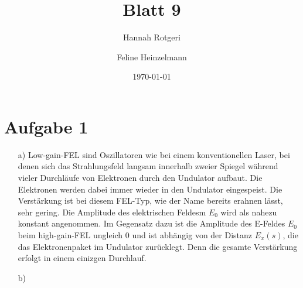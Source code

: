 \documentclass[11pt,a4paper]{article}
\title{Blatt 9}
\date{\today}
\author{Hannah Rotgeri \and Feline Heinzelmann}
\begin{document}
    \maketitle

    \section*{Aufgabe 1}
	\begin{itemize}
		\item[a)] 
			Low-gain-FEL sind Oszillatoren wie bei einem konventionellen Laser, bei denen sich das Strahlungsfeld langsam innerhalb zweier Spiegel während vieler 
			Durchläufe von Elektronen durch den Undulator aufbaut. Die Elektronen werden dabei immer wieder in den Undulator eingespeist. 
			Die Verstärkung ist bei diesem FEL-Typ, wie der Name bereits erahnen lässt, sehr gering.
			Die Amplitude des elektrischen Feldesm $E_0$ wird als nahezu konstant angenommen. \newline
			Im Gegensatz dazu ist die Amplitude des E-Feldes $E_0$ beim high-gain-FEL ungleich 0 und ist abhängig von der Distanz $E_{x}(s)$, die das 
			Elektronenpaket im Undulator zurücklegt.
			Denn die gesamte Verstärkung erfolgt in einem einizgen Durchlauf.
		\item[b)]
			

	\end{itemize}


	
\end{document}
